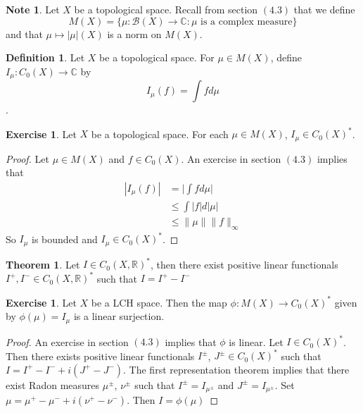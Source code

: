 \documentclass[12pt]{amsart}
\theoremstyle{definition}
\newtheorem{defn}[definition]{Definition}
\newtheorem{note}[definition]{Note}
\newtheorem{thm}[definition]{Theorem}
\newtheorem{ex}[definition]{Exercise}
\newcommand{\C}{\mathbb{C}}
\newcommand{\R}{\mathbb{R}}
\newcommand{\MB}{\mathcal{B}}
\newcommand{\lex}[1]{\label{ex:#1}}
\newcommand{\ld}[1]{\label{defn:#1}}
\begin{document}
	\begin{note}
	Let $X$ be a topological space. Recall from section $(4.3)$ that we define $$M(X) = \{\mu:\MB(X) \rightarrow \C: \mu \text{ is a complex measure}\}$$ and that $\mu \mapsto |\mu|(X)$ is a norm on $M(X)$. 
	\end{note}		
	
	\begin{defn} \ld{00000} 
	Let $X$ be a topological space. For $\mu \in M(X)$, define $I_{\mu} :C_0(X) \rightarrow \C$ by $$I_{\mu} (f) = \int f d\mu$$.
	\end{defn}
	
	\begin{ex} \lex{00000} 
	Let $X$ be a topological space. For each $\mu \in M(X)$, $I_\mu \in C_0(X)^*$.
	\end{ex}
	
	\begin{proof}
	Let $\mu \in M(X)$ and $f \in C_0(X)$. An exercise in section $(4.3)$ implies that 
	\begin{align*}
	|I_{\mu}(f)| 
	&= \bigg| \int f d\mu \bigg| \\
	& \leq \int |f| d |\mu| \\
	& \leq \| \mu \| \|f\|_{\infty}
	\end{align*}
	So $I_{\mu}$ is bounded and $I_{\mu} \in C_0(X)^*$.
	\end{proof}
	
	\begin{thm}
	Let $I \in C_0(X, \R)^*$, then there exist positive linear functionals $I^+, I^- \in C_0(X, \R)^*$ such that $I = I^+ - I^-$
	\end{thm}
	
	\begin{ex} \lex{00000} 
	Let $X$ be a LCH space. Then the map $ \phi: M(X) \rightarrow C_0(X)^*$ given by $\phi(\mu) = I_{\mu}$ is a linear surjection.
	\end{ex}
	
	\begin{proof}
	An exercise in section $(4.3)$ implies that $\phi$ is linear. Let $I \in C_0(X)^*$. Then there exists positive linear functionals $I^{\pm}$, $J^{\pm} \in C_0(X)^*$ such that $I = I^+ - I^- + i(J^+ - J^-)$. The first representation theorem implies that there exist Radon measures $\mu^{\pm}$, $\nu^{\pm}$ such that $I^{\pm} = I_{\mu^{\pm}}$ and $J^{\pm} = I_{\mu^{\pm}}$. Set $\mu = \mu^+ - \mu^- +i(\nu^+ - \nu ^-)$. Then $I = \phi(\mu)$
	\end{proof}
	
\end{document}

